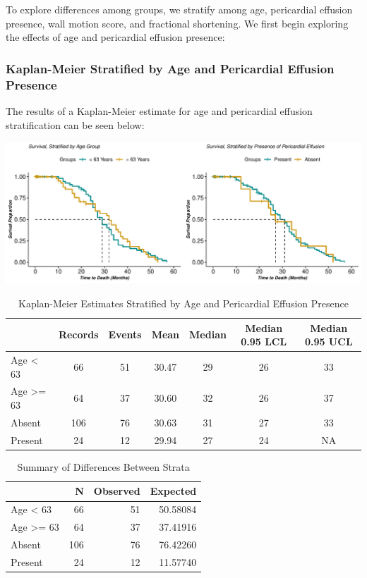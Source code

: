 \documentclass[
]{article}
\begin{document}
To explore differences among groups, we stratify among age, pericardial
effusion presence, wall motion score, and fractional shortening. We
first begin exploring the effects of age and pericardial effusion
presence:

\hypertarget{kaplan-meier-stratified-by-age-and-pericardial-effusion-presence}{%
\subsubsection{Kaplan-Meier Stratified by Age and Pericardial Effusion
Presence}\label{kaplan-meier-stratified-by-age-and-pericardial-effusion-presence}}

The results of a Kaplan-Meier estimate for age and pericardial effusion
stratification can be seen below:

\begin{center}\includegraphics{markdown_files/figure-latex/km.age.effusion-1} \end{center}

\begin{table}[!h]

\caption{\label{tab:ks2}Kaplan-Meier Estimates Stratified by Age and Pericardial Effusion Presence}
\centering
\begin{tabular}[t]{l|c|c|c|c|c|c}
\hline
  & Records & Events & Mean & Median & Median 0.95 LCL & Median 0.95 UCL\\
\hline
Age < 63 & 66 & 51 & 30.47 & 29 & 26 & 33\\
\hline
Age >= 63 & 64 & 37 & 30.60 & 32 & 26 & 37\\
\hline
Absent & 106 & 76 & 30.63 & 31 & 27 & 33\\
\hline
Present & 24 & 12 & 29.94 & 27 & 24 & NA\\
\hline
\end{tabular}
\end{table}

\begin{table}

\caption{\label{tab:ks2.survdiff}Summary of Differences Between Strata}
\centering
\begin{tabular}[t]{l|r|r|r}
\hline
  & N & Observed & Expected\\
\hline
Age < 63 & 66 & 51 & 50.58084\\
\hline
Age >= 63 & 64 & 37 & 37.41916\\
\hline
Absent & 106 & 76 & 76.42260\\
\hline
Present & 24 & 12 & 11.57740\\
\hline
\end{tabular}
\end{table}
\end{document}

